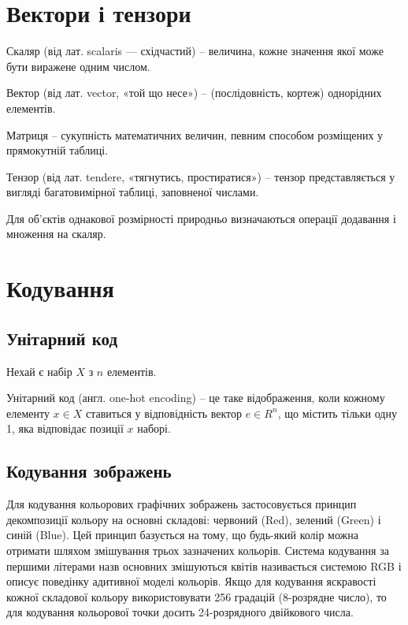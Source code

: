 \section{Вектори і тензори}

\begin{ozn}
Скаляр (від лат. scalaris — східчастий) -- величина, кожне значення якої може бути виражене одним числом.
\end{ozn}

\begin{ozn}
Вектор (від лат. vector, «той що несе») -- (послідовність, кортеж) однорідних елементів.
\end{ozn}

\begin{ozn}
Матриця -- сукупність математичних величин, певним способом розміщених у прямокутній таблиці.
\end{ozn}

\begin{ozn}
Тензор (від лат. tendere, «тягнутись, простиратися») -- тензор представляється у вигляді багатовимірної таблиці, заповненої числами.
 \end{ozn}

Для об'єктів однакової розмірності природньо визначаються операції додавання і множення на скаляр.

\section{Кодування}

\subsection{Унітарний код}

Нехай є набір $X$ з $n$ елементів. 

Унітарний код (англ. one-hot encoding) -- це таке відображення, коли кожному елементу $x \in X$ ставиться у відповідність вектор $e \in R^n$,  що містить тільки одну 1, яка відповідає позиції $x$ наборі.

\subsection{Кодування зображень}

Для кодування кольорових графічних зображень застосовується принцип декомпозиції кольору на основні складові: червоний (Red), зелений (Green) і синій (Blue). Цей принцип базується на тому, що будь-який колір можна отримати шляхом змішування трьох зазначених кольорів. Система кодування за першими літерами назв основних змішуються квітів називається системою RGB і описує поведінку адитивної моделі кольорів.  Якщо для кодування яскравості кожної складової кольору використовувати 256 градацій (8-розрядне число), то для кодування кольорової точки досить 24-розрядного двійкового числа.


